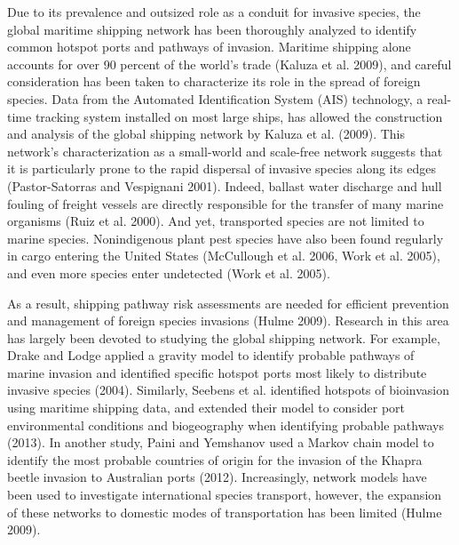 \documentclass[12pt]{article}
\begin{document}
Due to its prevalence and outsized role as a conduit for invasive species, the global maritime shipping network has been thoroughly analyzed to identify common hotspot ports and pathways of invasion.  Maritime shipping alone accounts for over 90 percent of the world's trade (Kaluza et al. 2009), and careful consideration has been taken to characterize its role in the spread of foreign species.  Data from the Automated Identification System (AIS) technology, a real-time tracking system installed on most large ships, has allowed the construction and analysis of the global shipping network by Kaluza et al. (2009).  This network's characterization as a small-world and scale-free network suggests that it is particularly prone to the rapid dispersal of invasive species along its edges (Pastor-Satorras and Vespignani 2001).  Indeed, ballast water discharge and hull fouling of freight vessels are directly responsible for the transfer of many marine organisms (Ruiz et al. 2000).  And yet, transported species are not limited to marine species. Nonindigenous plant pest species have also been found regularly in cargo entering the United States (McCullough et al. 2006, Work et al. 2005), and even more species enter undetected (Work et al. 2005).

As a result, shipping pathway risk assessments are needed for efficient prevention and management of foreign species invasions (Hulme 2009).  Research in this area has largely been devoted to studying the global shipping network.  For example, Drake and Lodge applied a gravity model to identify probable pathways of marine invasion and identified specific hotspot ports most likely to distribute invasive species (2004).   Similarly, Seebens et al. identified hotspots of bioinvasion using maritime shipping data, and extended their model to consider port environmental conditions and biogeography when identifying probable pathways (2013).  In another study, Paini and Yemshanov used a Markov chain model to identify the most probable countries of origin for the invasion of the Khapra beetle invasion to Australian ports (2012).  Increasingly, network models have been used to investigate international species transport, however, the expansion of these networks to domestic modes of transportation has been limited (Hulme 2009).
\end{document}
